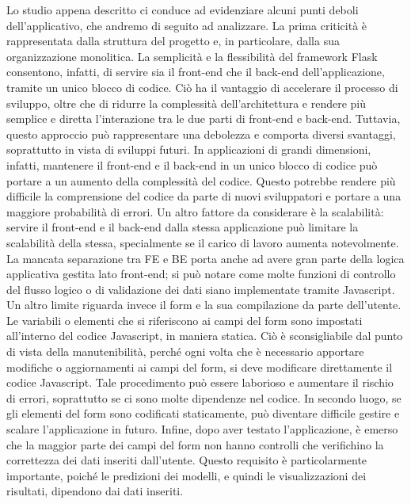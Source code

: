 Lo studio appena descritto ci conduce ad evidenziare alcuni punti deboli dell'applicativo, che andremo di seguito ad analizzare.
\newline
La prima criticità è rappresentata dalla struttura del progetto e, in particolare, dalla sua organizzazione monolitica. La semplicità e la flessibilità del framework Flask consentono, infatti, di servire sia il front-end che il back-end dell'applicazione, tramite un unico blocco di codice. Ciò ha il vantaggio di accelerare il processo di sviluppo, oltre che di ridurre la complessità dell'architettura e rendere più semplice e diretta l’interazione tra le due parti di front-end e back-end.
\newline
Tuttavia, questo approccio può rappresentare una debolezza e comporta diversi svantaggi, soprattutto in vista di sviluppi futuri. In applicazioni di grandi dimensioni, infatti, mantenere il front-end e il back-end in un unico blocco di codice può portare a un aumento della complessità del codice. Questo potrebbe rendere più difficile la comprensione del codice da parte di nuovi sviluppatori e portare a una maggiore probabilità di errori. 
\newline
Un altro fattore da considerare è la scalabilità: servire il front-end e il back-end dalla stessa applicazione può limitare la scalabilità della stessa, specialmente se il carico di lavoro aumenta notevolmente.
\newline
La mancata separazione tra FE e BE porta anche ad avere gran parte della logica applicativa gestita lato front-end; si può notare come molte funzioni di controllo del flusso logico o di validazione dei dati siano implementate tramite Javascript.
\newline
Un altro limite riguarda invece il form e la sua compilazione da parte dell'utente. Le variabili o elementi che si riferiscono ai campi del form sono impostati all'interno del codice Javascript, in maniera statica.
Ciò è sconsigliabile dal punto di vista della manutenibilità, perché ogni volta che è necessario apportare modifiche o aggiornamenti ai campi del form, si deve modificare direttamente il codice Javascript. Tale procedimento può essere laborioso e aumentare il rischio di errori, soprattutto se ci sono molte dipendenze nel codice. In secondo luogo, se gli elementi del form sono codificati staticamente, può diventare difficile gestire e scalare l'applicazione in futuro.
\newline
Infine, dopo aver testato l’applicazione, è emerso che la maggior parte dei campi del form non hanno controlli che verifichino la correttezza dei dati inseriti dall'utente. Questo requisito è particolarmente importante, poiché le predizioni dei modelli, e quindi le visualizzazioni dei risultati, dipendono dai dati inseriti. 

